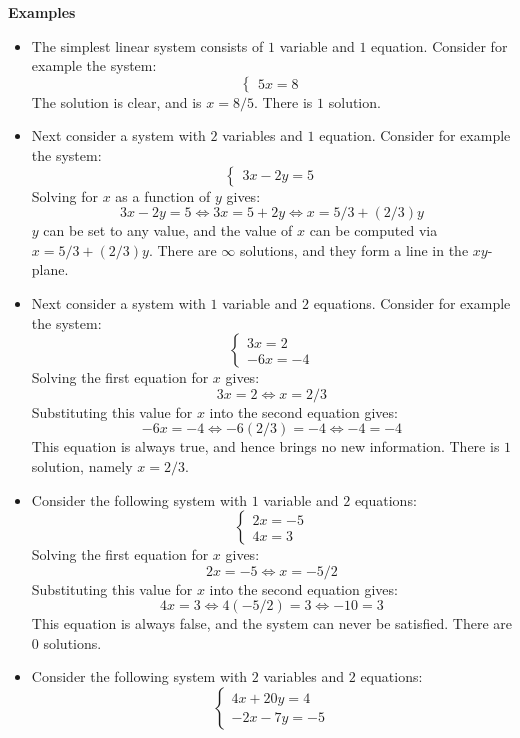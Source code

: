 \documentclass{article}
\begin{document}
\textbf{Examples}
\begin{itemize}
\item The simplest linear system consists of \(1\) variable and \(1\) equation. Consider for example the system: 
\[\left\{\begin{array}{c} 5x = 8 \end{array}\right.\]
The solution is clear, and is \(x = 8/5\). There is \(1\) solution.
\item Next consider a system with \(2\) variables and \(1\) equation. Consider for example the system:  
\[\left\{\begin{array}{c} 3x - 2y = 5 \end{array}\right.\]
Solving for \(x\) as a function of \(y\) gives:
\[3x - 2y = 5 \iff 3x = 5 + 2y \iff x = 5/3 + (2/3)y\]
\(y\) can be set to any value, and the value of \(x\) can be computed via \(x = 5/3 + (2/3)y\). There are \(\infty\) solutions, and they form a line in the \(xy\)-plane.
\item Next consider a system with \(1\) variable and \(2\) equations. Consider for example the system:  
\[\left\{\begin{array}{c} 3x = 2 \\ -6x = -4 \end{array}\right.\]
Solving the first equation for \(x\) gives:
\[3x = 2 \iff x = 2/3\]
Substituting this value for \(x\) into the second equation gives:
\[-6x = -4 \iff -6(2/3) = -4 \iff -4 = -4\]
This equation is always true, and hence brings no new information. There is \(1\) solution, namely \(x = 2/3\).
\item Consider the following system with \(1\) variable and \(2\) equations:  
\[\left\{\begin{array}{c} 2x = -5 \\ 4x = 3 \end{array}\right.\]
Solving the first equation for \(x\) gives:
\[2x = -5 \iff x = -5/2\]
Substituting this value for \(x\) into the second equation gives:
\[4x = 3 \iff 4(-5/2) = 3 \iff -10 = 3\]
This equation is always false, and the system can never be satisfied. There are \(0\) solutions.
\item Consider the following system with \(2\) variables and \(2\) equations:  
\[\left\{\begin{array}{c} 4x + 20y = 4 \\ -2x - 7y = -5 \end{array}\right.\]

\end{itemize}
\end{document}
